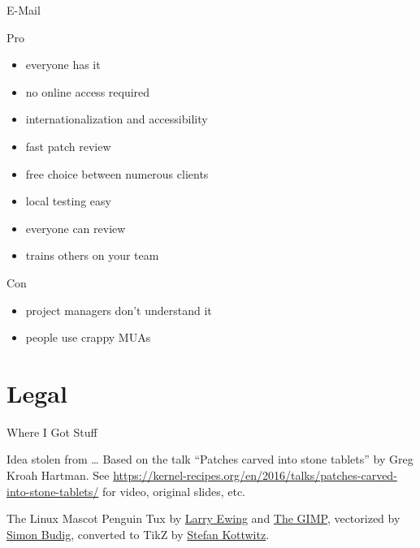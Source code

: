 \documentclass{beamer}
\begin{document}
\begin{frame}{E-Mail}
    \begin{exampleblock}{Pro}
        \begin{itemize}
            \item everyone has it
            \item no online access required
            \item internationalization and accessibility
            \item fast patch review
            \item free choice between numerous clients
            \item local testing easy
            \item everyone can review
            \item trains others on your team
        \end{itemize}
    \end{exampleblock}
    \pause
    \begin{alertblock}{Con}
        \begin{itemize}
            \item project managers don't understand it
            \item people use crappy MUAs
        \end{itemize}
    \end{alertblock}
\end{frame}

\section{Legal}

\begin{frame}{Where I Got Stuff}
    \begin{block}{Idea stolen from …}
        Based on the talk \enquote{Patches carved into stone tablets} by
        Greg Kroah Hartman. See
        \url{https://kernel-recipes.org/en/2016/talks/patches-carved-into-stone-tablets/}
        for video, original slides, etc.
    \end{block}
    \begin{block}{The Linux Mascot}
        Penguin Tux by \href{mailto:lewing@isc.tamu.edu}{Larry Ewing}
        and \href{http://isc.tamu.edu/~lewing/linux/}{The GIMP},
        vectorized by \href{http://www.home.unix-ag.org/simon/}{Simon Budig},
        converted to TikZ by
        \href{http://www.texample.net/weblog/2012/apr/28/tux-tex-tikz/}{Stefan Kottwitz}.
    \end{block}
\end{frame}
\end{document}
